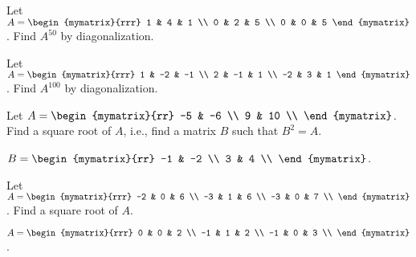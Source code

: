 \begin{ex}
  Let $A = \begin{mymatrix}{rrr}
    1 & 4 & 1 \\
    0 & 2 & 5 \\
    0 & 0 & 5
  \end{mymatrix}$. Find $A^{50}$ by diagonalization.
\end{ex}

\begin{ex}
  Let $A = \begin{mymatrix}{rrr}
    1 & -2 & -1 \\
    2 & -1 & 1 \\
    -2 & 3 & 1
  \end{mymatrix}$. Find $A^{100}$ by diagonalization.
\end{ex}

\begin{ex}
  Let $A = \begin{mymatrix}{rr}
    -5 & -6 \\
    9 & 10 \\
  \end{mymatrix}$. Find a square root of $A$, i.e., find a matrix $B$
  such that $B^2=A$.
  \begin{sol}
    $B=\begin{mymatrix}{rr}
      -1 & -2 \\
      3  & 4 \\
  \end{mymatrix}$.
  \end{sol}
\end{ex}

\begin{ex}
  Let $A = \begin{mymatrix}{rrr}
    -2 & 0 & 6 \\
    -3 & 1 & 6 \\
    -3 & 0 & 7 \\
  \end{mymatrix}$. Find a square root of $A$.
  \begin{sol}
    $A = \begin{mymatrix}{rrr}
      0  &  0 & 2 \\
      -1 &  1 & 2 \\
      -1 &  0 & 3 \\
    \end{mymatrix}$.
  \end{sol}
\end{ex}

